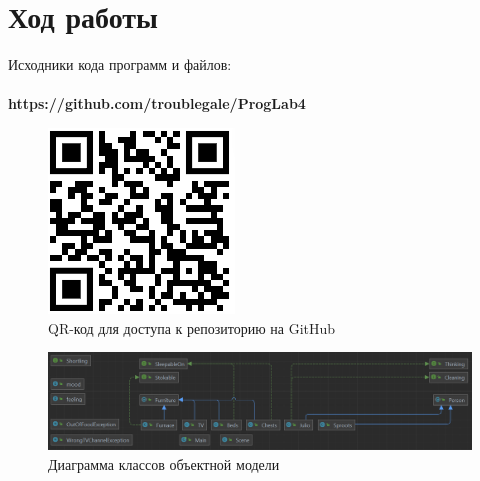 \documentclass[12pt]{article}
\begin{document}
\newpage

\section{Ход работы}

Исходники кода программ и файлов:\\
\\
\textbf{https://github.com/troublegale/ProgLab4}

\begin{figure}[h]
    \centering
    \includegraphics{image1.png}
    \caption{QR-код для доступа к репозиторию на GitHub}
\end{figure}

\begin{figure}[h]
    \centering
    \includegraphics[width=0.8\linewidth]{image2.png}
    \caption{Диаграмма классов объектной модели}
\end{figure}
\end{document}
